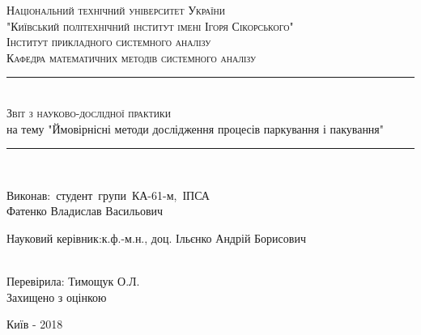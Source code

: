 \newcommand{\horrule}[1]{\rule{\linewidth}{#1}}
\begin{titlepage}
	
	\begin{center}
		\large \scshape Національний технічний університет України\\ "Київський політехнічний інститут імені Ігоря Сікорського"\\[0.5cm]
		\normalfont
		\normalsize
		Інститут прикладного системного аналізу\\
		Кафедра математичних методів системного аналізу\\
		[4.5cm]
		\normalfont 
		\horrule{0.5pt} \\[0.4cm]
		{\large \scshape Звіт з науково-дослідної практики}\\[0.6cm]
		 на тему "Ймовірнісні методи дослідження процесів паркування і пакування"
		\horrule{2pt} \\[2.0cm]
	\end{center}

	\begin{flushright}
		Виконав:~студент~групи~КА-61-м,~ІПСА\\
		Фатенко Владислав Васильович\\
	\end{flushright}
	\begin{flushright}
    Науковий керівник:к.ф.-м.н., доц. Ільєнко Андрій Борисович\\
    \makebox[.3\linewidth][r]{\hrulefill} \\
    \end{flushright}
	\begin{flushright}
    Перевірила: Тимощук О.Л.\\
    Захищено з оцінкою \makebox[.3\linewidth][r]{\hrulefill} \\
    \end{flushright}
	\vfill 
	\begin{center}
		{\large Київ - 2018} 
	\end{center}
	
	\thispagestyle{empty}
\end{titlepage}
\restoregeometry
